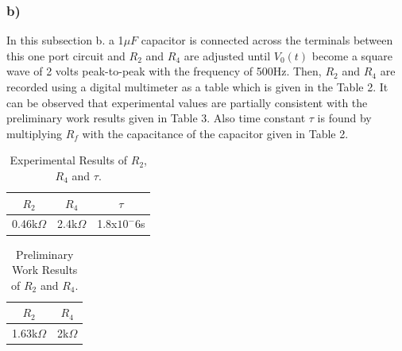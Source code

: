 \documentclass[letterpaper,12pt]{article}
\begin{document}
\subsubsection{b)}
In this subsection b. a 1\(\mu F\) capacitor is connected across the terminals between this one port circuit and \(R_2 \) and \(R_4 \) are adjusted until \(V_0(t)\) become a square wave of 2 volts peak-to-peak with the frequency of 500Hz. Then, \(R_2 \) and \(R_4 \) are recorded using a digital multimeter as a table which is given in the Table 2. It can be observed that experimental values are partially consistent with the preliminary work results given in Table 3. Also time constant \(\tau\) is found by multiplying \(R_f\) with the capacitance of the capacitor given in Table 2. 
\begin{table}[H]
    \begin{center}
        \caption{Experimental Results of \(R_2\),\(R_4\) and \(\tau \).}
        \vspace{2mm}
        \begin{tabular}{||c | c | c ||} 
            \hline
            \(R_2\) & \(R_4\) &  \(\tau \) \\ [0.5ex] 
            \hline\hline
            0.46k\(\Omega\) & 2.4k\(\Omega\) &  1.8x\(10^-6\)s \\
            \hline
        \end{tabular}
    \end{center}
\end{table}

\begin{table}[H]
    \begin{center}
        \caption{Preliminary Work Results of \(R_2\) and \(R_4\).}
        \vspace{2mm}
        \begin{tabular}{||c | c ||} 
            \hline
            \(R_2\) & \(R_4\) \\ [0.5ex] 
            \hline\hline
            1.63k\(\Omega\) & 2k\(\Omega\)   \\
            \hline
        \end{tabular}
    \end{center}
\end{table}
\end{document}
